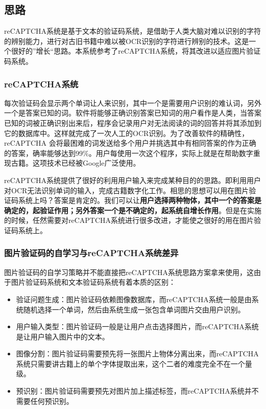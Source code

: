 \documentclass[bachelor,zhspacing]{cqu}  %
\def\tightlist{}
\begin{document}
\subsection{思路}\label{ux601dux8def}

reCAPTCHA系统是基于文本的验证码系统，是借助于人类大脑对难以识别的字符的辨别能力，进行对古旧书籍中难以被OCR识别的字符进行辨别的技术。这是一个很好的''增长``思路。本系统参考了reCAPTCHA系统，将其改进以适应图片验证码系统。

\subsubsection{reCAPTCHA系统}\label{recaptchaux7cfbux7edf}

每次验证码会显示两个单词让人来识别，其中一个是需要用户识别的难认词，另外一个是答案已知的词。软件将能够正确识别答案已知词的用户看作是人类，当答案已知的词被正确识别出来后，程序会记录用户对无法阅读的词的回答并将其添加到它的数据库中。这样就完成了一次人工的OCR识别。为了改善软件的精确性，
reCAPTCHA
会将最困难的词发送给多个用户并挑选其中有相同答案的作为正确的答案，确率能够达到99\%。用户每使用一次这个程序，实际上就是在帮助数字重现古籍。这项技术已经被Google广泛使用。

reCAPTCHA系统提供了很好的利用用户输入来完成某种目的的思路。即利用用户对OCR无法识别单词的输入，完成古籍数字化工作。相思的思想可以用在图片验证码系统上吗？答案是肯定的。我们可以让\textbf{用户选择两种物体，其中一个的答案是确定的，起验证作用；另外答案一个是不确定的，起系统自增长作用}。但是在实施的时候，任然需要对reCAPTCHA系统进行很多改进，才能使之很好的用在图片验证码系统上。

\subsubsection{图片验证码的自学习与reCAPTCHA系统差异}\label{ux56feux7247ux9a8cux8bc1ux7801ux7684ux81eaux5b66ux4e60ux4e0erecaptchaux7cfbux7edfux5deeux5f02}

图片验证码的自学习策略并不能直接把reCAPTCHA系统思路方案拿来使用，这由于图片验证码系统和文本验证码系统有着本质的区别：

\begin{itemize}
\tightlist
\item
  验证问题生成：图片验证码依赖图像数据库，而reCAPTCHA系统一般是由系统随机选择一个单词，然后由系统生成一张包含单词图片交由用户识别。
\item
  用户输入类型：图片验证码一般是让用户点击选择图片，而reCAPTCHA系统是让用户输入图片中的文本。
\item
  图像分割：图片验证码需要预先将一张图片上物体分离出来，而reCAPTCHA系统只需要讲古籍上的单个字体提取出来，这个二者的难度完全不在一个量级。
\item
  预识别：图片验证码需要预先对图片加上描述标签，而reCAPTCHA系统并不需要任何预识别。
\end{itemize}
\end{document}

